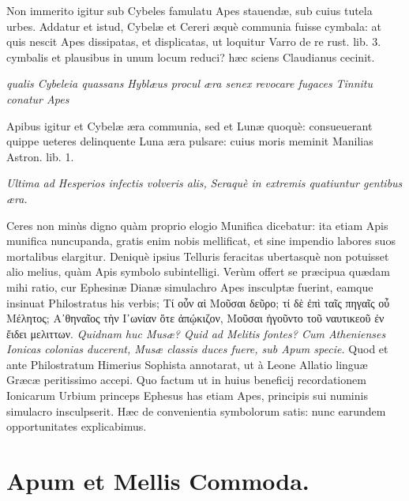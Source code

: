 \documentclass[a4paper, 11pt, oneside, polutonikogreek, latin]{article}
\begin{document}
Non immerito igitur sub Cybeles famulatu Apes stauendæ, sub cuius tutela urbes. Addatur et istud, Cybelæ et Cereri æquè communia fuisse cymbala: at quis nescit Apes dissipatas, et displicatas, ut loquitur Varro de re rust. lib. 3. cymbalis et plausibus in unum locum reduci? hæc sciens Claudianus cecinit.

\emph{qualis Cybeleia quassans}
\emph{Hyblæus procul æra senex revocare fugaces}
\emph{Tinnitu conatur Apes}

Apibus igitur et Cybelæ æra communia, sed et Lunæ quoquè: consueuerant quippe ueteres delinquente Luna æra pulsare: cuius moris meminit Manilias Astron. lib. 1.

\emph{Ultima ad Hesperios infectis volveris alis,}
\emph{Seraquè in extremis quatiuntur gentibus æra.}

Ceres non minùs digno quàm proprio elogio Munifica dicebatur: ita etiam Apis munifica nuncupanda, gratis enim nobis mellificat, et sine impendio labores suos mortalibus elargitur. Deniquè ipsius Telluris feracitas ubertasquè non potuisset alio melius, quàm Apis symbolo subintelligi. Verùm offert se præcipua quædam mihi ratio, cur Ephesinæ Dianæ simulachro Apes insculptæ fuerint, eamque insinuat Philostratus his verbis; Τί οὖν αἱ Μοῦσαι δεῦρο; τί δὲ ἐπὶ ταῖς πηγαῖς οὖ Μέλητος; Α᾽θηναῖος τὴν I᾽ωνίαν ὅτε ἀπῴκιζον, Μοῦσαι ἡγοῦντο τοῦ ναυτικεοῦ ἐν ἔιδει μελιττων. \emph{Quidnam huc Musæ? Quid ad Melitis fontes? Cum Athenienses Ionicas colonias ducerent, Musæ classis duces fuere, sub Apum specie.} Quod et ante Philostratum Himerius Sophista annotarat, ut à Leone Allatio linguæ Græcæ peritissimo accepi. Quo factum ut in huius beneficij recordationem Ionicarum Urbium princeps Ephesus has etiam Apes, principis sui numinis simulacro insculpserit. Hæc de convenientia symbolorum satis: nunc earundem opportunitates explicabimus.
\clearpage
\section{Apum et Mellis Commoda.}
\end{document}
